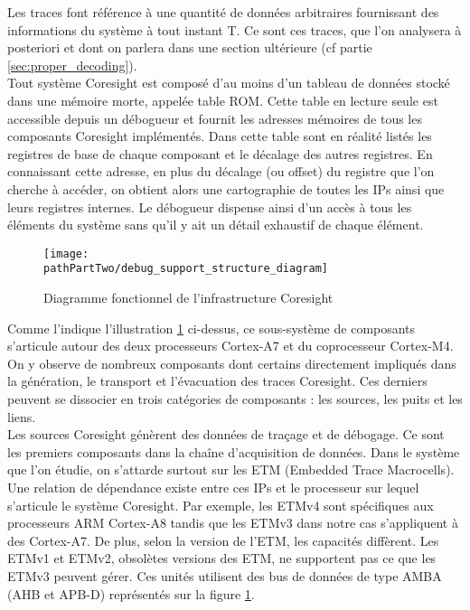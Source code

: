 Les traces font référence à une quantité de données arbitraires fournissant
des informations du système à tout instant T. Ce sont ces traces, que l'on
analysera à posteriori et dont on parlera dans une section ultérieure (cf
partie \ref{sec:proper_decoding}). \\

Tout système Coresight est composé d'au moins d'un tableau de données stocké
dans une mémoire morte, appelée table ROM. Cette table en lecture seule est
accessible depuis un débogueur et fournit les adresses mémoires de tous les
composants Coresight implémentés. Dans cette table sont en réalité listés les
registres de base de chaque composant et le décalage des autres registres. En
connaissant cette adresse, en plus du décalage (ou offset) du registre que l'on
cherche à accéder, on obtient alors une cartographie de toutes les IPs ainsi
que leurs registres internes.  Le débogueur dispense ainsi d'un accès à tous
les éléments du système sans qu'il y ait un détail exhaustif de chaque
élément. \\

\begin{figure}[H]
	\begin{center}
		\texttt{[image: \\pathPartTwo/debug\_support\_structure\_diagram]}
		\caption{Diagramme fonctionnel de l'infrastructure Coresight}
	    \label{fig:debug_support_structure_diagram}
	\end{center}
\end{figure}

Comme l'indique l'illustration \ref{fig:debug_support_structure_diagram}
ci-dessus, ce sous-système de composants s'articule autour des deux
processeurs Cortex-A7 et du coprocesseur Cortex-M4. On y observe de nombreux
composants dont certains directement impliqués dans la génération, le
transport et l'évacuation des traces Coresight. Ces derniers peuvent se
dissocier en trois catégories de composants : les sources, les puits et les
liens. \\

Les sources Coresight génèrent des données de traçage et de débogage. Ce sont
les premiers composants dans la chaîne d'acquisition de données. Dans le
système que l'on étudie, on s'attarde surtout sur les ETM (Embedded Trace
Macrocells).  Une relation de dépendance existe entre ces IPs et le processeur
sur lequel s'articule le système Coresight. Par exemple, les ETMv4 sont
spécifiques aux processeurs ARM Cortex-A8 tandis que les ETMv3 dans notre cas
s'appliquent à des Cortex-A7. De plus, selon la version de l'ETM, les capacités
diffèrent. Les ETMv1 et ETMv2, obsolètes versions des ETM, ne supportent pas
ce que les ETMv3 peuvent gérer. %
Ces unités utilisent des bus de données de type AMBA (AHB et APB-D)
représentés sur la figure \ref{fig:debug_support_structure_diagram}. \\ 

